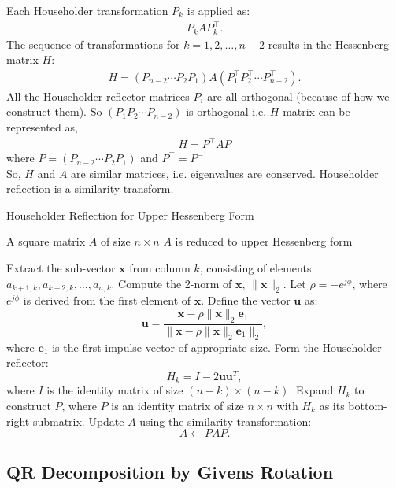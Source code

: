 \documentclass[12pt]{article}
\begin{document}
Each Householder transformation $P_k$ is applied as:
\begin{align*}
P_k A P_k^{\top}.
\end{align*}
The sequence of transformations for $k = 1, 2, \dots, n-2$ results in the Hessenberg matrix \(H\):
\begin{align*}
H = (P_{n-2} \cdots P_2 P_1)A(P_1^{\top} P_2^{\top} \cdots P_{n-2}^{\top}).
\end{align*}
All the Householder reflector matrices $P_i$ are all orthogonal (because of how we construct them). So $(P_1 P_2 \cdots P_{n-2})$ is orthogonal i.e. $H$ matrix can be represented as,
\begin{align*}
    H = P^{\top}A P
\end{align*}
where $P=(P_{n-2} \cdots P_2 P_1)$ and $P^{\top}=P^{-1}$\\
So, $H$ and $A$ are similar matrices, i.e. eigenvalues are conserved. Householder reflection is a similarity transform.
\begin{algorithm}[H]
\caption{Householder Reflection for Upper Hessenberg Form}
\begin{algorithmic}[1]
\REQUIRE A square matrix $A $ of size $n \times n$
\ENSURE $A$ is reduced to upper Hessenberg form

    \STATE Extract the sub-vector \( \mathbf{x} \) from column \( k \), consisting of elements \( a_{k+1,k}, a_{k+2,k}, \ldots, a_{n,k} \).
    \STATE Compute the 2-norm of \( \mathbf{x} \), \( \| \mathbf{x} \|_2 \).
    \STATE Let \( \rho = -e^{j\phi} \), where \( e^{j\phi} \) is derived from the first element of \( \mathbf{x} \).
    \STATE Define the vector \( \mathbf{u} \) as:
    \[
    \mathbf{u} = \frac{\mathbf{x} - \rho \|\mathbf{x}\|_2 \mathbf{e}_1}{\| \mathbf{x} - \rho \|\mathbf{x}\|_2 \mathbf{e}_1 \|_2},
    \]
    where \( \mathbf{e}_1 \) is the first impulse vector of appropriate size.
    \STATE Form the Householder reflector:
    \[
    H_k = I - 2\mathbf{u}\mathbf{u}^T,
    \]
    where \( I \) is the identity matrix of size \( (n-k) \times (n-k) \).
    \STATE Expand \( H_k \) to construct \( P \), where \( P \) is an identity matrix of size \( n \times n \) with \( H_k \) as its bottom-right submatrix.
    \STATE Update \( A \) using the similarity transformation:
    \[
    A \gets P A P.
    \]
\ENDFOR 
\end{algorithmic}
\end{algorithm}


\subsection{QR Decomposition by Givens Rotation}
\end{document}
